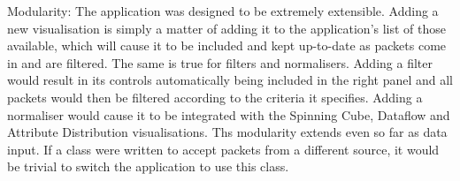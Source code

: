Modularity:
The application was designed to be extremely extensible.  Adding a new visualisation is simply a matter of adding it to the application's list of those available, which will cause it to be included and kept up-to-date as packets come in and are filtered.  The same is true for filters and normalisers.  Adding a filter would result in its controls automatically being included in the right panel and all packets would then be filtered according to the criteria it specifies.  Adding a normaliser would cause it to be integrated with the Spinning Cube, Dataflow and Attribute Distribution visualisations.  Ths modularity extends even so far as data input.  If a class were written to accept packets from a different source, it would be trivial to switch the application to use this class.